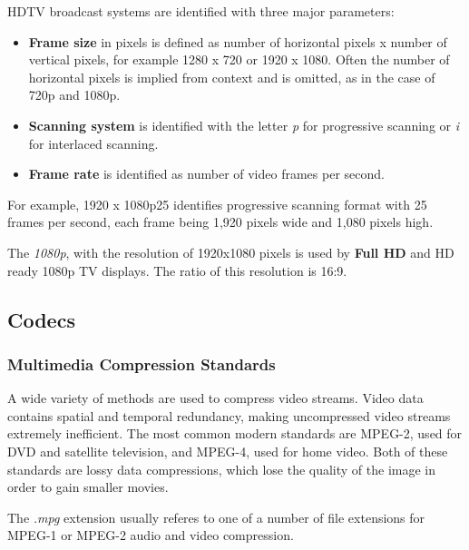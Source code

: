 HDTV broadcast systems are identified with three major parameters:
\begin{itemize}
  \item \textbf{Frame size} in pixels is defined as number of horizontal
  pixels x number of vertical pixels, for example 1280 x 720 or 1920 x 1080.
  Often the number of horizontal pixels is implied from context and is
  omitted, as in the case of 720p and 1080p.
  \item \textbf{Scanning system} is identified with the letter \textit{p} for
  progressive scanning or \textit{i} for interlaced scanning.
  \item \textbf{Frame rate} is identified as number of video frames per
  second.
\end{itemize}

For example, 1920 x 1080p25 identifies progressive scanning format with 25
frames per second, each frame being 1,920 pixels wide and 1,080 pixels high.

The \textit{1080p}, with the resolution of 1920x1080 pixels is used by
\textbf{Full HD} and HD ready 1080p TV displays. The ratio of this resolution
is 16:9.

\subsection{Codecs}
\label{subsec:multimedia-dist:codecs}

\subsubsection{Multimedia Compression Standards}

A wide variety of methods are used to compress video streams. Video data
contains spatial and temporal redundancy, making uncompressed video streams
extremely inefficient. The most common modern standards are MPEG-2, used for
DVD and satellite television, and MPEG-4, used for home video. Both of these
standards are lossy data compressions, which lose the quality of the image in
order to gain smaller movies.

The \textit{.mpg} extension usually referes to one of a number of file
extensions for MPEG-1 or MPEG-2 audio and video compression.

